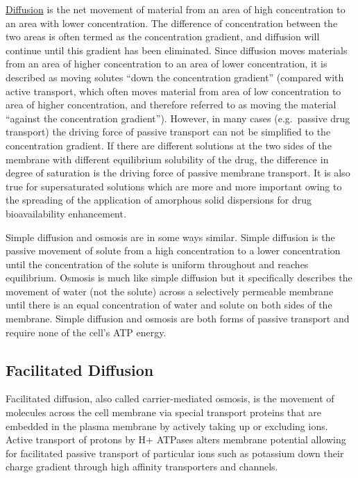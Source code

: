 \href{https://en.wikipedia.org/wiki/Diffusion}{Diffusion} is the net movement of material from an area of high concentration to an area with lower concentration. The difference of concentration between the two areas is often termed as the concentration gradient, and diffusion will continue until this gradient has been eliminated. Since diffusion moves materials from an area of higher concentration to an area of lower concentration, it is described as moving solutes ``down the concentration gradient'' (compared with active transport, which often moves material from area of low concentration to area of higher concentration, and therefore referred to as moving the material ``against the concentration gradient''). However, in many cases (e.g.~passive drug transport) the driving force of passive transport can not be simplified to the concentration gradient. If there are different solutions at the two sides of the membrane with different equilibrium solubility of the drug, the difference in degree of saturation is the driving force of passive membrane transport. It is also true for supersaturated solutions which are more and more important owing to the spreading of the application of amorphous solid dispersions for drug bioavailability enhancement.

Simple diffusion and osmosis are in some ways similar. Simple diffusion is the passive movement of solute from a high concentration to a lower concentration until the concentration of the solute is uniform throughout and reaches equilibrium. Osmosis is much like simple diffusion but it specifically describes the movement of water (not the solute) across a selectively permeable membrane until there is an equal concentration of water and solute on both sides of the membrane. Simple diffusion and osmosis are both forms of passive transport and require none of the cell's ATP energy.

\hypertarget{facilitated-diffusion}{%
\subsection{Facilitated Diffusion}\label{facilitated-diffusion}}

Facilitated diffusion, also called carrier-mediated osmosis, is the movement of molecules across the cell membrane via special transport proteins that are embedded in the plasma membrane by actively taking up or excluding ions. Active transport of protons by H+ ATPases alters membrane potential allowing for facilitated passive transport of particular ions such as potassium down their charge gradient through high affinity transporters and channels.

